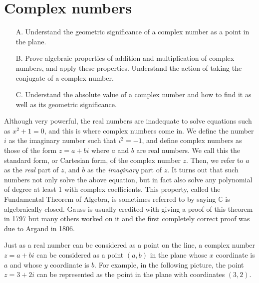 \section{Complex numbers}

\begin{outcome}
\begin{enumerate}
\item[A.]  Understand the geometric significance of a complex number as a point
in the plane.

\item[B.]  Prove algebraic properties of addition and multiplication of complex numbers, and 
apply these properties. Understand the action of taking the conjugate of a complex number.

\item[C.]  Understand the absolute value of a complex number and how to find it
as well as its geometric significance.
\end{enumerate}
\end{outcome}

Although very powerful, the real numbers are inadequate to solve
equations such as $x^2+1=0$, and this is where complex numbers come
in. We define the number $i$ as the imaginary number such that $i^2 =
-1$, and define complex numbers as those of the form $z = a + bi$
where $a$ and $b$ are real numbers. We call this the standard form, or Cartesian form, of the complex number
$z$.
Then, we refer to $a$ as the
{\em real\em} part of $z$, and $b$ as the {\em imaginary\em} part of
$z$. It turns out that such numbers not only solve the above equation,
but in fact also solve any polynomial of degree at least 1 with complex coefficients. This property, called the Fundamental Theorem of Algebra, is sometimes referred to by saying $\mathbb{C}$ is
algebraically closed. Gauss is usually credited with giving a proof
of this theorem in 1797 but many others worked on it and the first
completely correct proof was due to Argand in 1806.

Just as a real number can be considered as a point on the line, a
complex number $z = a + bi$ can be considered as a point $\left(
a,b\right) $ in the plane whose $x$ coordinate is $ a$ and whose $y$
coordinate is $b.$ For example, in the following picture, the point $z
= 3+2i$ can be represented as the point in the plane with
coordinates $\left( 3,2\right) .$

\begin{center}
\end{center}


